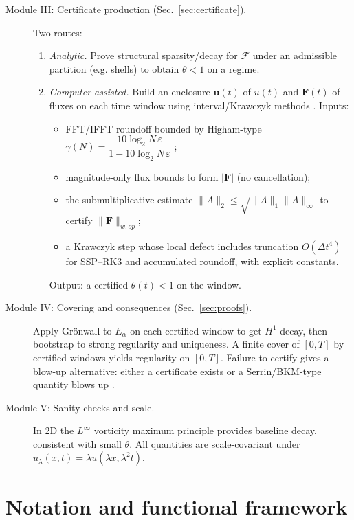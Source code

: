 \IfFileExists{nyjm.cls}{\documentclass[11pt]{nyjm}}{\documentclass[11pt]{amsart}}
\theoremstyle{plain}
\theoremstyle{definition}
\theoremstyle{remark}
\begin{document}
\begin{description}
  \item[Module III: Certificate production (Sec.~\ref{sec:certificate}).]
  Two routes:
  \begin{enumerate}
    \item[(A)] \emph{Analytic.} Prove structural sparsity/decay for $\mathcal F$ under an admissible partition (e.g. shells) to obtain $\theta<1$ on a regime.
    \item[(B)] \emph{Computer-assisted.} Build an enclosure $\mathbf u(t)$ of $u(t)$ and $\mathbf F(t)$ of fluxes on each time window using interval/Krawczyk methods \cite{MooreKearfottCloud2009,Tucker2011}. Inputs:
      \begin{itemize}
        \item FFT/IFFT roundoff bounded by Higham-type $\gamma(N)=\dfrac{10\log_2 N\,\varepsilon}{1-10\log_2 N\,\varepsilon}$ \cite{Higham2002};
        \item magnitude-only flux bounds to form $|\mathbf F|$ (no cancellation);
        \item the submultiplicative estimate $\|A\|_2\le \sqrt{\|A\|_1\|A\|_\infty}$ to certify $\|\mathbf F\|_{w,op}$;
        \item a Krawczyk step whose local defect includes truncation $O(\Delta t^4)$ for SSP--RK3 and accumulated roundoff, with explicit constants.
      \end{itemize}
      Output: a certified $\theta(t)<1$ on the window.
  \end{enumerate}

  \item[Module IV: Covering and consequences (Sec.~\ref{sec:proofs}).]
  Apply Gr\"onwall to $E_\alpha$ on each certified window to get $H^1$ decay, then bootstrap to strong regularity and uniqueness. A finite cover of $[0,T]$ by certified windows yields regularity on $[0,T]$. Failure to certify gives a blow-up alternative: either a certificate exists or a Serrin/BKM-type quantity blows up \cite{Serrin1962,BealeKatoMajda1984,CKN1982}.

  \item[Module V: Sanity checks and scale.]
  In 2D the $L^\infty$ vorticity maximum principle provides baseline decay, consistent with small $\theta$. All quantities are scale-covariant under $u_\lambda(x,t)=\lambda u(\lambda x,\lambda^2 t)$.
\end{description}


\section{Notation and functional framework}\label{sec:notation}
\end{document}
